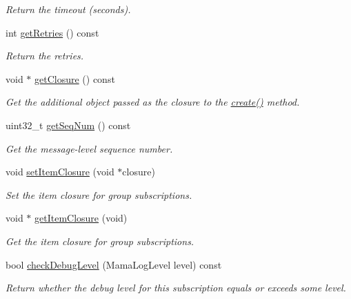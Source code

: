 \begin{CompactItemize}
\begin{CompactList}\small\item\em Return the timeout (seconds). \item\end{CompactList}\item 
int \hyperlink{classWombat_1_1MamdaSubscription_624e4473fbe1118382a863fc19e8e922}{get\-Retries} () const 
\begin{CompactList}\small\item\em Return the retries. \item\end{CompactList}\item 
void $\ast$ \hyperlink{classWombat_1_1MamdaSubscription_94f2a70bd2c4d39558a9c7b34d1a9de4}{get\-Closure} () const 
\begin{CompactList}\small\item\em Get the additional object passed as the closure to the \hyperlink{classWombat_1_1MamdaSubscription_f73189395471119f1cffa620d9ad824e}{create()} method. \item\end{CompactList}\item 
uint32\_\-t \hyperlink{classWombat_1_1MamdaSubscription_b9b3dc27e6a1a40b52e9a1810e3042fe}{get\-Seq\-Num} () const 
\begin{CompactList}\small\item\em Get the message-level sequence number. \item\end{CompactList}\item 
void \hyperlink{classWombat_1_1MamdaSubscription_44bbc1a7a16e9415099166d69346e6a2}{set\-Item\-Closure} (void $\ast$closure)
\begin{CompactList}\small\item\em Set the item closure for group subscriptions. \item\end{CompactList}\item 
void $\ast$ \hyperlink{classWombat_1_1MamdaSubscription_b4359bc7b96f715697fd690e535a4273}{get\-Item\-Closure} (void)
\begin{CompactList}\small\item\em Get the item closure for group subscriptions. \item\end{CompactList}\item 
bool \hyperlink{classWombat_1_1MamdaSubscription_8e21b5cae69bba048335e3e19802543f}{check\-Debug\-Level} (Mama\-Log\-Level level) const 
\begin{CompactList}\small\item\em Return whether the debug level for this subscription equals or exceeds some level. \item\end{CompactList}\end{CompactItemize}


